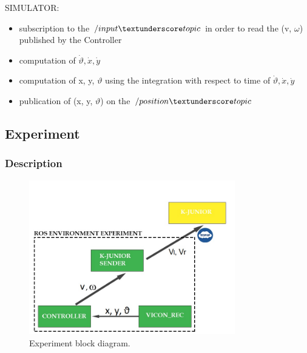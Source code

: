 \documentclass[a4paper,11pt,oneside]{book}
\begin{document}
SIMULATOR:
\begin{itemize}
\item subscription to the $/input\textunderscore topic$ in order to read the (v, $\omega$) published by the Controller
\item computation of $\dot{\vartheta}, \dot{x}, \dot{y}$
\item computation of x, y, $\vartheta$ using the integration with respect to time of $\dot{\vartheta}, \dot{x}, \dot{y}$
\item publication of (x, y, $\vartheta$) on the $/position\textunderscore topic$
\end{itemize}

\subsection {Experiment}
\subsubsection{Description}
\begin{figure}[H]
\begin{center}
\includegraphics[width=0.8\textwidth]{figs/Experiment}
\caption[Experiment block diagram]{Experiment block diagram.}
\end{center}
\end{figure}
\end{document}
